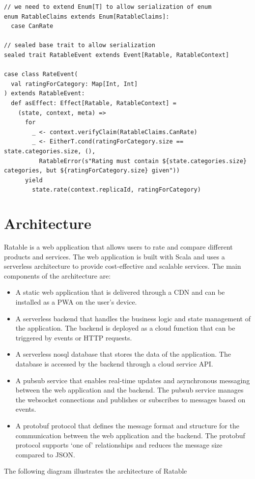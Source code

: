 \documentclass[
	ngerman,
	ruledheaders=section,   %
	class=report,		    %
	thesis={type=bachelor}, %
	accentcolor=9c,			%
	custommargins=true,    %
	marginpar=false,        %
	parskip=half-,          %
	fontsize=11pt,          %
]{tudapub}
\begin{document}
\begin{lstlisting}
// we need to extend Enum[T] to allow serialization of enum
enum RatableClaims extends Enum[RatableClaims]:
  case CanRate

// sealed base trait to allow serialization
sealed trait RatableEvent extends Event[Ratable, RatableContext]

case class RateEvent(
  val ratingForCategory: Map[Int, Int]
) extends RatableEvent:
  def asEffect: Effect[Ratable, RatableContext] =
    (state, context, meta) =>
      for
        _ <- context.verifyClaim(RatableClaims.CanRate)
        _ <- EitherT.cond(ratingForCategory.size == state.categories.size, (),
          RatableError(s"Rating must contain ${state.categories.size} categories, but ${ratingForCategory.size} given"))
      yield
        state.rate(context.replicaId, ratingForCategory)
\end{lstlisting}

\chapter{Architecture}


Ratable is a web application that allows users to rate and compare different products and services. The web application is built with Scala and uses a serverless architecture to provide cost-effective and scalable services. The main components of the architecture are:

\begin{itemize}
  \item A static web application that is delivered through a CDN and can be installed as a PWA on the user’s device.
  \item A serverless backend that handles the business logic and state management of the application. The backend is deployed as a cloud function that can be triggered by events or HTTP requests.
  \item A serverless nosql database that stores the data of the application. The database is accessed by the backend through a cloud service API.
  \item A pubsub service that enables real-time updates and asynchronous messaging between the web application and the backend. The pubsub service manages the websocket connections and publishes or subscribes to messages based on events.
  \item A protobuf protocol that defines the message format and structure for the communication between the web application and the backend. The protobuf protocol supports ‘one of’ relationships and reduces the message size compared to JSON.
\end{itemize}
The following diagram illustrates the architecture of Ratable
\end{document}
